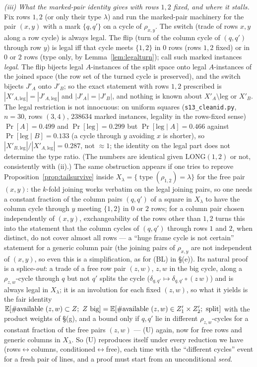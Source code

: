 \emph{(iii) What the marked-pair identity gives with rows $1,2$
fixed, and where it stalls.}  Fix rows $1,2$ (or only their type
$\lambda$) and run the marked-pair machinery for the pair $(x,y)$ with
a mark $\{q,q'\}$ on a cycle of $\rho_{x,y}$.  The switch (trade of
rows $x,y$ along a row cycle) is always legal.  The flip (turn of the
column cycle of $(q,q')$ through row $y$) is legal iff that cycle meets
$\{1,2\}$ in $0$ rows (rows $1,2$ fixed) or in $0$ or $2$ rows (type
only, by Lemma~\ref{lem:legalturn}); call such marked instances
\emph{legal}.  The flip bijects legal $A$-instances of the split space
onto legal $A$-instances of the joined space (the row set of the
turned cycle is preserved), and the switch bijects $J'_A$ onto
$J'_B$; so the exact statement with rows $1,2$ prescribed is
$|X'_{A,\mathrm{leg}}|=|J'_{A,\mathrm{leg}}|$ and $|J'_A|=|J'_B|$,
and nothing is known about $X'_{A}\setminus\mathrm{leg}$ or $X'_B$.
The legal restriction is not innocuous: on uniform squares
(\texttt{s13\_cleanid.py}, $n=30$, rows $(3,4)$, $238634$ marked
instances, legality in the rows-fixed sense) $\Pr[A]=0.499$ and
$\Pr[\mathrm{leg}]=0.299$ but $\Pr[\mathrm{leg}\mid A]=0.466$ against
$\Pr[\mathrm{leg}\mid B]=0.133$ (a cycle through $y$ avoiding $x$ is
shorter), so $|X'_{B,\mathrm{leg}}|/|X'_{A,\mathrm{leg}}|=0.287$, not
$\approx1$; the identity on the legal part does not determine the type
ratio.  (The numbers are identical given $\mathrm{LONG}(1,2)$ or not,
consistently with (ii).)  The same obstruction appears if one tries to
reprove Proposition~\ref{prop:tailsurvive} inside
$X_\lambda=\{\operatorname{type}(\rho_{1,2})=\lambda\}$ for the free
pair $(x,y)$: the $k$-fold joining works verbatim on the legal joining
pairs, so one needs a constant fraction of the column pairs
$(q,q')$ of a square in $X_\lambda$ to have the column cycle through
$y$ meeting $\{1,2\}$ in $0$ or $2$ rows; for a column pair chosen
independently of $(x,y)$, exchangeability of the rows other than $1,2$
turns this into the statement that the column cycles of $(q,q')$
through rows $1$ and $2$, when distinct, do not cover almost all rows
--- a ``huge frame cycle is not certain'' statement for a generic
column pair (the joining pairs of $\rho_{x,y}$ are not independent of
$(x,y)$, so even this is a simplification, as for (BL) in \S(e)).  Its
natural proof is a splice-\emph{out}: a trade of a free row pair
$(z,w)$, $z,w$ in the big cycle, along a $\rho_{z,w}$-cycle through
$q$ but not $q'$ splits the cycle
($\delta_{q,q'}\mapsto\delta_{q,q'}\circ(z\,w)$) and is always legal
in $X_\lambda$; it is an involution for each fixed $(z,w)$, so what it
yields is the fair identity
$\E[\#\text{available }(z,w)\subset Z;\ Z\text{ big}]=\E[\#\text{available }(z,w)\in Z'_1\times Z'_2;\ \text{split}]$
with the product weights of \S(g), and a bound only if $q,q'$ lie in
different $\rho_{z,w}$-cycles for a constant fraction of the free
pairs $(z,w)$ --- (U) again, now for free rows and generic columns in
$X_\lambda$.  So (U) reproduces itself under every reduction we have
(rows$\leftrightarrow$columns, conditioned$\leftrightarrow$free), each
time with the ``different cycles'' event for a fresh pair of lines, and
a proof must start from an unconditional \emph{seed}.

